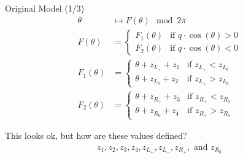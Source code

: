 \begin{frame}{Original Model (1/3)}
    \vspace{-2.0em}
    \begin{align}
        \theta      & \mapsto  F(\theta) \mod 2 \pi
        \\
        F(\theta)   & = \begin{cases}
                            F_1(\theta) & \text{if } q \cdot \cos(\theta) > 0 \\
                            F_2(\theta) & \text{if } q \cdot \cos(\theta) < 0
                        \end{cases}
        \\
        F_1(\theta) & = \begin{cases}
                            \theta + z_{L_+} + z_1 & \text{if } z_{L_+} < z_{L_0} \\
                            \theta + z_{L_0} + z_2 & \text{if } z_{L_+} > z_{L_0}
                        \end{cases}
        \\
        F_2(\theta) & = \begin{cases}
                            \theta + z_{R_+} + z_3 & \text{if } z_{R_+} < z_{R_0} \\
                            \theta + z_{R_0} + z_4 & \text{if } z_{R_+} > z_{R_0}
                        \end{cases}
    \end{align}

    \pause
    \vspace{2em}
    This looks ok, but how are these values defined?
    \begin{align*}
        z_1, z_2, z_3, z_4, z_{L_+}, z_{L_-}, z_{R_+}, \text{ and } z_{R_0}
    \end{align*}
\end{frame}

